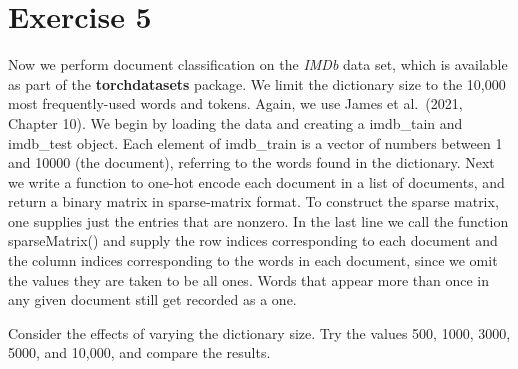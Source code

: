 \documentclass[
]{article}
\begin{document}
\newpage

\section{Exercise 5}\label{exercise-5}

Now we perform document classification on the \textit{IMDb} data set,
which is available as part of the \textbf{torchdatasets} package. We
limit the dictionary size to the 10,000 most frequently-used words and
tokens. Again, we use James et al.~(2021, Chapter 10). We begin by
loading the data and creating a imdb\_tain and imdb\_test object. Each
element of imdb\_train is a vector of numbers between 1 and 10000 (the
document), referring to the words found in the dictionary. Next we write
a function to one-hot encode each document in a list of documents, and
return a binary matrix in sparse-matrix format. To construct the sparse
matrix, one supplies just the entries that are nonzero. In the last line
we call the function sparseMatrix() and supply the row indices
corresponding to each document and the column indices corresponding to
the words in each document, since we omit the values they are taken to
be all ones. Words that appear more than once in any given document
still get recorded as a one.

Consider the effects of varying the dictionary size. Try the values 500,
1000, 3000, 5000, and 10,000, and compare the results.
\end{document}
